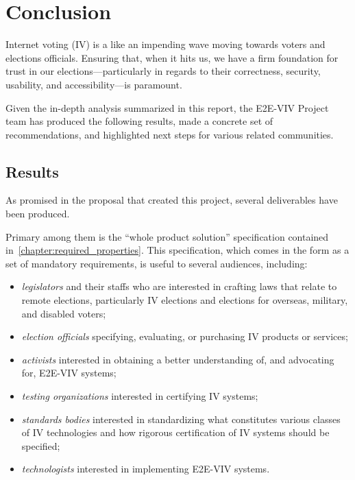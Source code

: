 \chapter{Conclusion}
\label{chapter:conclusion}

Internet voting (IV) is a like an impending wave moving towards voters
and elections officials.  Ensuring that, when it hits us, we have a
firm foundation for trust in our elections---particularly in regards
to their correctness, security, usability, and accessibility---is
paramount.

Given the in-depth analysis summarized in this report, the E2E-VIV
Project team has produced the following results, made a concrete set
of recommendations, and highlighted next steps for various related
communities.

\section{Results}

As promised in the proposal that created this project,
several deliverables have been produced.  

Primary among them is the ``whole product solution'' specification
contained in~\autoref{chapter:required_properties}. This
specification, which comes in the form as a set of mandatory
requirements, is useful to several audiences, including:
\begin{itemize}
\item \emph{legislators} and their staffs who are interested in
  crafting laws that relate to remote elections, particularly IV
  elections and elections for overseas, military, and disabled voters;
\item \emph{election officials} specifying, evaluating, or purchasing
  IV products or services;
\item \emph{activists} interested in obtaining a better understanding
  of, and advocating for, E2E-VIV systems;
\item \emph{testing organizations} interested in certifying IV
  systems;
\item \emph{standards bodies} interested in standardizing what
  constitutes various classes of IV technologies and how rigorous
  certification of IV systems should be specified;
\item \emph{technologists} interested in implementing E2E-VIV systems.
\end{itemize}

